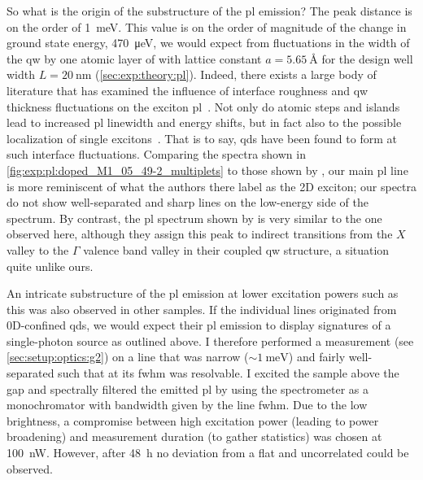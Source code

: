 So what is the origin of the substructure of the \gls{pl} emission?
The peak distance is on the order of \qty{1}{\milli\electronvolt}.
This value is on the order of magnitude of the change in ground state energy, \qty{470}{\micro\electronvolt}, we would expect from fluctuations in the width of the \gls{qw} by one atomic layer of  with lattice constant $a = \qty{5.65}{\angstrom}$
for the design well width $L = \qty{20}{\nano\meter}$ (\cref{sec:exp:theory:pl}).
Indeed, there exists a large body of literature that has examined the influence of interface roughness and \gls{qw} thickness fluctuations on the exciton \gls{pl}~\cite{Tanaka1987,Gammon1991,Leosson2000}.
Not only do atomic steps and islands lead to increased \gls{pl} linewidth and energy shifts, but in fact also to the possible localization of single excitons~\cite{Brunner1994,Brunner1994a,Zrenner1994}.
That is to say, \glspl{qd} have been found to form at such interface fluctuations.
Comparing the spectra shown in \cref{fig:exp:pl:doped_M1_05_49-2_multiplets} to those shown by \textcite[Figure~1]{Brunner1994}, our main \gls{pl} line is more reminiscent of what the authors there label as the 2D exciton; our spectra do not show well-separated and sharp lines on the low-energy side of the spectrum.
By contrast, the \gls{pl} spectrum shown by \textcite[Figure~1]{Zrenner1994} is very similar to the one observed here, although they assign this peak to indirect transitions from the  $X$ valley to the  $\Gamma$ valence band valley in their  coupled \gls{qw} structure, a situation quite unlike ours.

An intricate substructure of the \gls{pl} emission at lower excitation powers such as this was also observed in other samples.
If the individual lines originated from 0D-confined \glspl{qd}, we would expect their \gls{pl} emission to display signatures of a single-photon source as outlined above. %
I therefore performed a  measurement (see \cref{sec:setup:optics:g2}) on a line that was narrow ($\sim\qty{1}{\milli\electronvolt}$) and fairly well-separated such that at its \gls{fwhm} was resolvable.
I excited the sample above the gap and spectrally filtered the emitted \gls{pl} by using the spectrometer as a monochromator with bandwidth given by the line \gls{fwhm}.
Due to the low brightness, a compromise between high excitation power (leading to power broadening) and measurement duration (to gather statistics) was chosen at \qty{100}{\nano\watt}.
However, after \qty{48}{\hour} no deviation from a flat and uncorrelated  could be observed.

